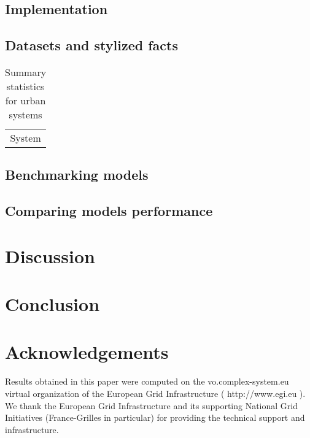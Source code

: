 \documentclass[alpha-refs]{wiley-article}
\begin{document}
\subsection{Implementation}


\subsection{Datasets and stylized facts}



\begin{table}
	\caption{Summary statistics for urban systems}
	\begin{tabular}{|c|}
		System \\
	\end{tabular}
\end{table}




\subsection{Benchmarking models}


\subsection{Comparing models performance}




\section{Discussion}






\section{Conclusion}





\section*{Acknowledgements}

Results obtained in this paper were computed on the vo.complex-system.eu virtual organization of the European Grid Infrastructure ( http://www.egi.eu ). We thank the European Grid Infrastructure and its supporting National Grid Initiatives (France-Grilles in particular) for providing the technical support and infrastructure.
\end{document}
